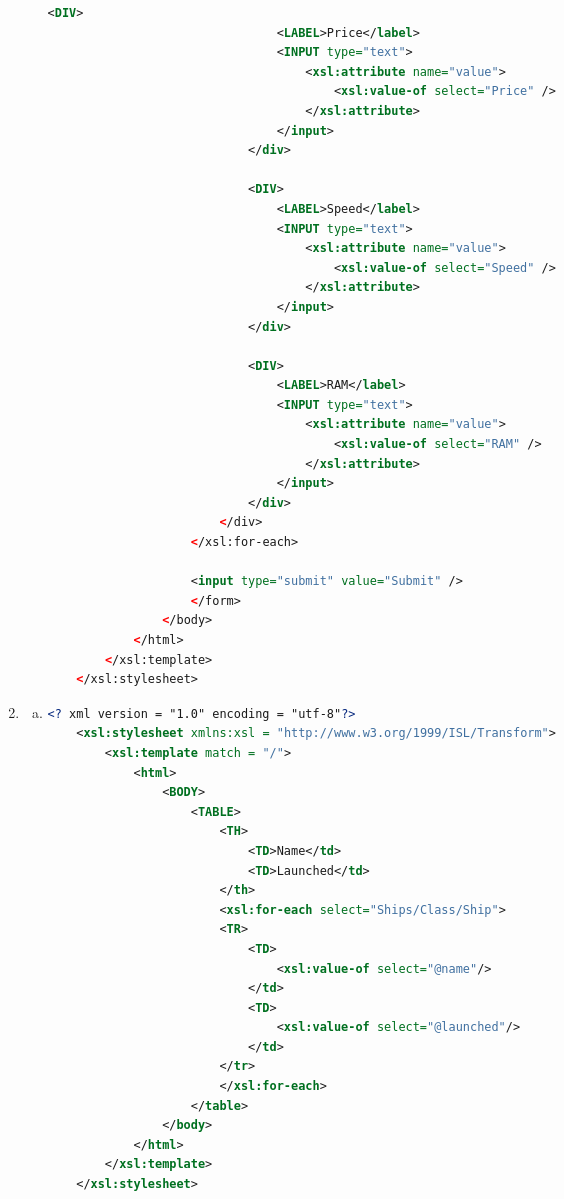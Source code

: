 \documentclass[12pt]{article}
\begin{document}
\begin{enumerate}[1.]
\begin{enumerate}[a)]
\begin{lstlisting}[language=XML]
                            <DIV>
                                <LABEL>Price</label>
                                <INPUT type="text">
                                    <xsl:attribute name="value">
                                        <xsl:value-of select="Price" />
                                    </xsl:attribute>
                                </input>
                            </div>

                            <DIV>
                                <LABEL>Speed</label>
                                <INPUT type="text">
                                    <xsl:attribute name="value">
                                        <xsl:value-of select="Speed" />
                                    </xsl:attribute>
                                </input>
                            </div>

                            <DIV>
                                <LABEL>RAM</label>
                                <INPUT type="text">
                                    <xsl:attribute name="value">
                                        <xsl:value-of select="RAM" />
                                    </xsl:attribute>
                                </input>
                            </div>
                        </div>
                    </xsl:for-each>

                    <input type="submit" value="Submit" />
                    </form>
                </body>
            </html>
        </xsl:template>
    </xsl:stylesheet>
    \end{lstlisting}

    \end{enumerate}

        \item

    \begin{enumerate}[a)]
        \item

    \begin{lstlisting}[language=XML]
    <? xml version = "1.0" encoding = "utf-8"?>
    <xsl:stylesheet xmlns:xsl = "http://www.w3.org/1999/ISL/Transform">
        <xsl:template match = "/">
            <html>
                <BODY>
                    <TABLE>
                        <TH>
                            <TD>Name</td>
                            <TD>Launched</td>
                        </th>
                        <xsl:for-each select="Ships/Class/Ship">
                        <TR>
                            <TD>
                                <xsl:value-of select="@name"/>
                            </td>
                            <TD>
                                <xsl:value-of select="@launched"/>
                            </td>
                        </tr>
                        </xsl:for-each>
                    </table>
                </body>
            </html>
        </xsl:template>
    </xsl:stylesheet>
    \end{lstlisting}


\end{enumerate}
\end{enumerate}
\end{document}
